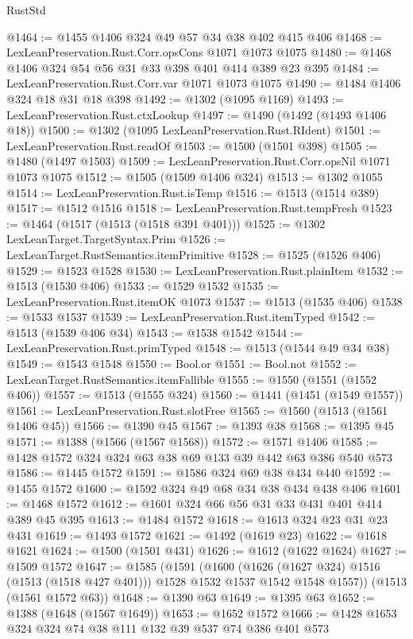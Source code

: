 \begin{lexlean}{RustStd}
\begin{coremodule}
{\begin{coremodule}
{{{{{{{{@1464 := @1455 @1406 @324 @49 @57 @34 @38 @402 @415 @406
@1468 := LexLeanPreservation.Rust.Corr.opsCons @1071 @1073 @1075
@1480 := @1468 @1406 @324 @54 @56 @31 @33 @398 @401 @414 @389 @23 @395
@1484 := LexLeanPreservation.Rust.Corr.var @1071 @1073 @1075
@1490 := @1484 @1406 @324 @18 @31 @18 @398
@1492 := @1302 (@1095 @1169)
@1493 := LexLeanPreservation.Rust.ctxLookup
@1497 := @1490 (@1492 (@1493 @1406 @18))
@1500 := @1302 (@1095 LexLeanPreservation.Rust.RIdent)
@1501 := LexLeanPreservation.Rust.readOf
@1503 := @1500 (@1501 @398)
@1505 := @1480 (@1497 @1503)
@1509 := LexLeanPreservation.Rust.Corr.opsNil @1071 @1073 @1075
@1512 := @1505 (@1509 @1406 @324)
@1513 := @1302 @1055
@1514 := LexLeanPreservation.Rust.isTemp
@1516 := @1513 (@1514 @389)
@1517 := @1512 @1516
@1518 := LexLeanPreservation.Rust.tempFresh
@1523 := @1464 (@1517 (@1513 (@1518 @391 @401)))
@1525 := @1302 LexLeanTarget.TargetSyntax.Prim
@1526 := LexLeanTarget.RustSemantics.itemPrimitive
@1528 := @1525 (@1526 @406)
@1529 := @1523 @1528
@1530 := LexLeanPreservation.Rust.plainItem
@1532 := @1513 (@1530 @406)
@1533 := @1529 @1532
@1535 := LexLeanPreservation.Rust.itemOK @1073
@1537 := @1513 (@1535 @406)
@1538 := @1533 @1537
@1539 := LexLeanPreservation.Rust.itemTyped
@1542 := @1513 (@1539 @406 @34)
@1543 := @1538 @1542
@1544 := LexLeanPreservation.Rust.primTyped
@1548 := @1513 (@1544 @49 @34 @38)
@1549 := @1543 @1548
@1550 := Bool.or
@1551 := Bool.not
@1552 := LexLeanTarget.RustSemantics.itemFallible
@1555 := @1550 (@1551 (@1552 @406))
@1557 := @1513 (@1555 @324)
@1560 := @1441 (@1451 (@1549 @1557))
@1561 := LexLeanPreservation.Rust.slotFree
@1565 := @1560 (@1513 (@1561 @1406 @45))
@1566 := @1390 @45
@1567 := @1393 @38
@1568 := @1395 @45
@1571 := @1388 (@1566 (@1567 @1568))
@1572 := @1571 @1406
@1585 := @1428 @1572 @324 @324 @63 @38 @69 @133 @39 @442 @63 @386 @540 @573
@1586 := @1445 @1572
@1591 := @1586 @324 @69 @38 @434 @440
@1592 := @1455 @1572
@1600 := @1592 @324 @49 @68 @34 @38 @434 @438 @406
@1601 := @1468 @1572
@1612 := @1601 @324 @66 @56 @31 @33 @431 @401 @414 @389 @45 @395
@1613 := @1484 @1572
@1618 := @1613 @324 @23 @31 @23 @431
@1619 := @1493 @1572
@1621 := @1492 (@1619 @23)
@1622 := @1618 @1621
@1624 := @1500 (@1501 @431)
@1626 := @1612 (@1622 @1624)
@1627 := @1509 @1572
@1647 := @1585
    (@1591
      (@1600
        (@1626 (@1627 @324) @1516 (@1513 (@1518 @427 @401)))
        @1528
        @1532
        @1537
        @1542
        @1548
        @1557))
    (@1513 (@1561 @1572 @63))
@1648 := @1390 @63
@1649 := @1395 @63
@1652 := @1388 (@1648 (@1567 @1649))
@1653 := @1652 @1572
@1666 := @1428 @1653 @324 @324 @74 @38 @111 @132 @39 @537 @74 @386 @401 @573
}}}}}}}}
\end{coremodule}}
\end{coremodule}
\end{lexlean}
